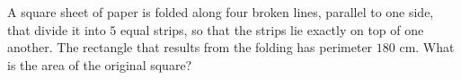 A square sheet of paper is folded along four broken lines, parallel to one side, that divide it into $5$ equal strips, so that the strips lie exactly on top of one another. The rectangle that results from the folding has perimeter $180$ cm. What is the area of the original square?
